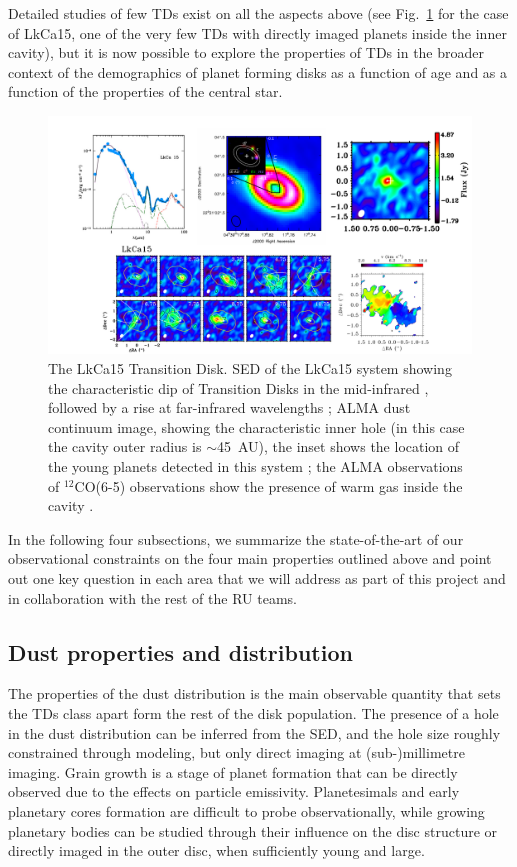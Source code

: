 \documentclass[10pt,fleqn,twoside]{article}
\begin{document}
Detailed studies of few TDs exist on all the aspects above (see Fig.~\ref{f_examples} for the case of LkCa15, one of the very few TDs with directly imaged planets inside the inner cavity), but it is now possible to explore the properties of TDs in the broader context of the demographics of planet forming disks as a function of age and as a function of the properties of the central star.  
\begin{figure}
\centerline{\includegraphics[scale=0.5]{Figure_LkCa15.pdf}}
\caption{The LkCa15 Transition Disk.  SED of the LkCa15 system showing the characteristic dip
  of Transition Disks in the mid-infrared , followed by a rise at
  far-infrared wavelengths \citep{2011ApJ...728...49E}; ALMA dust continuum
  image, showing the characteristic inner hole (in this case the cavity
  outer radius is $\sim$45~AU), the inset shows the location of the young
  planets detected in this system \citep{2015Natur.527..342S}; the ALMA
  observations of $^{12}$CO(6-5) observations show the presence of warm gas
  inside the cavity \citep{2015A&A...579A.106V}.}
\label{f_examples}
\end{figure}

In the following four subsections, we summarize the state-of-the-art of our observational constraints on the four main properties outlined above and point out one key question in each area that we will address as part of this project and in collaboration with the rest of the RU teams.

\subsection{Dust properties and distribution} 
The properties of the dust distribution is the main observable quantity that sets the TDs class apart form the rest of the disk population. The presence of a hole in the dust distribution can be inferred from the SED, and the hole size roughly constrained through modeling, but only direct imaging at (sub-)millimetre imaging.
Grain growth is a stage of planet formation that can be directly observed due to the effects on particle emissivity. Planetesimals and early planetary cores formation are difficult to probe observationally, while growing planetary bodies can be studied through their influence on the disc structure or directly imaged in the outer disc, when sufficiently young and large.
\end{document}
